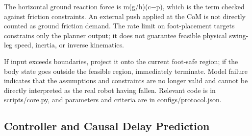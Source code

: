 The horizontal ground reaction force is m(g/h)(c−p), which is the term checked against friction constraints. An external push applied at the CoM is not directly counted as ground friction demand. The rate limit on foot-placement targets constrains only the planner output; it does not guarantee feasible physical swing-leg speed, inertia, or inverse kinematics.

If input exceeds boundaries, project it onto the current foot-safe region; if the body state goes outside the feasible region, immediately terminate. Model failure indicates that the assumptions and constraints are no longer valid and cannot be directly interpreted as the real robot having fallen. Relevant code is in scripts/core.py, and parameters and criteria are in configs/protocol.json.

\subsection{Controller and Causal Delay Prediction}\label{s17-detail-3}

